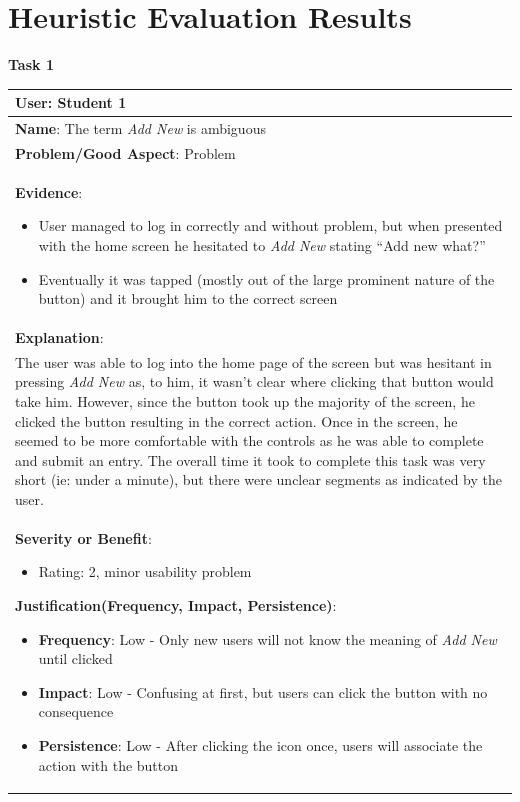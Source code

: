 \documentclass[pdftex,12pt,a4paper]{report}
\begin{document}
\section*{Heuristic Evaluation Results}
\textbf{Task 1}
\begin{center}
	\begin{longtable}{|p{\textwidth}|}
	\hline
	\textbf{User}: Student 1\\
	\hline
	\textbf{Name}: The term \emph{Add New} is ambiguous\\
	\hline
	\textbf{Problem/Good Aspect}: Problem\\
	\hline
	\textbf{Evidence}:
	\begin{itemize}
	\item{User managed to log in correctly and without problem, but when presented with the home screen he hesitated to \emph{Add New} stating ``Add new what?''}
	\item{Eventually it was tapped (mostly out of the large prominent nature of the button) and it brought him to the correct screen}
	\end{itemize}\\
	\hline
	\textbf{Explanation}:\\
	The user was able to log into the home page of the screen but was hesitant in pressing \emph{Add New} as, to him, it wasn't clear where clicking that button would take him. However, since the button took up the majority of the screen, he clicked the button resulting in the correct action. Once in the screen, he seemed to be more comfortable with the controls as he was able to complete and submit an entry. The overall time it took to complete this task was very short (ie: under a minute), but there were unclear segments as indicated by the user.\\
	\hline
	\textbf{Severity or Benefit}:
	\begin{itemize}
	\item{Rating: 2, minor usability problem}
	\end{itemize}
	\textbf{Justification(Frequency, Impact, Persistence)}:
	\begin{itemize}
	\item{\textbf{Frequency}:} Low - Only new users will not know the meaning of \emph{Add New} until clicked
	\item{\textbf{Impact}:} Low - Confusing at first, but users can click the button with no consequence
	\item{\textbf{Persistence}:} Low - After clicking the icon once, users will associate the action with the button

\end{itemize}
\end{longtable}
\end{center}
\end{document}
